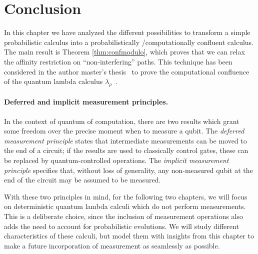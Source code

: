 \section{Conclusion}
In this chapter we have analyzed the different possibilities to
transform a simple probabilistic calculus into a probabilistically
/computationally confluent calculus. The main result is Theorem 
\ref{thm:confmodulo}, which proves that we can relax the affinity
restriction on ``non-interfering'' paths. This technique has been
considered in the author master's thesis~\cite{Romero20} to
prove the computational confluence of the quantum lambda calculus
$\lambda_\rho$~\cite{lambdarho}.

\paragraph{Deferred and implicit measurement principles.}
In the context of quantum of computation, there are two results
which grant some freedom over the precise moment when to measure
a qubit. The \emph{deferred measurement principle} states that
intermediate measurements can be moved to the end of a circuit;
if the results are used to classically control gates, these can
be replaced by quantum-controlled operations. The \emph{implicit
measurement principle} specifies that, without loss of generality,
any non-measured qubit at the end of the circuit may be assumed to
be measured.

With these two principles in mind, for the following two chapters,
we will focus on deterministic quantum lambda calculi which do not
perform measurements. This is a deliberate choice, since the inclusion of
measurement operations also adds the need to account for probabilistic
evolutions. We will study different characteristics of these calculi,
but model them with insights from this chapter to make a future
incorporation of measurement as seamlessly as possible.

